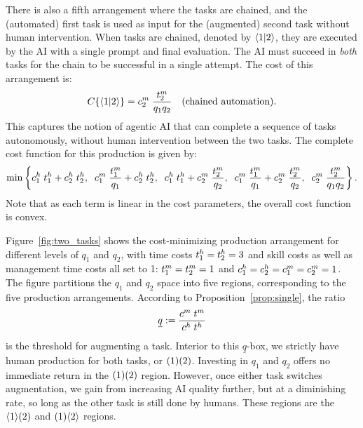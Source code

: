 \documentclass{article}
\theoremstyle{plain}
\theoremstyle{plain}
\begin{document}
There is also a fifth arrangement where the tasks are chained, and the (automated) first task is used as input for the (augmented) second task without human intervention.
When tasks are chained, denoted by $\langle 1|2 \rangle$, they are executed by the AI with a single prompt and final evaluation.
The AI must succeed in \emph{both} tasks for the chain to be successful in a single attempt.
The cost of this arrangement is:
\begin{align*}
C\{ \langle 1|2 \rangle \} &= c^{m}_{2} \; \frac{t^{m}_{2}}{q_1 q_2} & \text{(chained automation)}.
\end{align*}
This captures the notion of agentic AI that can complete a sequence of tasks autonomously, without human intervention between the two tasks.
The complete cost function for this production is given by:
\begin{align}
  \min \left\{ 
  c^{h}_{1} \; t^{h}_{1} + c^{h}_{2} \; t^{h}_{2}, \;\; 
  c^{m}_{1} \; \frac{t^{m}_{1}}{q_1} + c^{h}_{2} \; t^{h}_{2}, \;\; 
  c^{h}_{1} \; t^{h}_{1} + c^{m}_{2} \; \frac{t^{m}_{2}}{q_2}, \;\; 
  c^{m}_{1} \; \frac{t^{m}_{1}}{q_1} + c^{m}_{2} \; \frac{t^{m}_{2}}{q_2}, \;\; 
  c^{m}_{2} \; \frac{t^{m}_{2}}{q_1 q_2}
  \right\}.
\end{align}
Note that as each term is linear in the cost parameters, the overall cost function is convex.

Figure~\ref{fig:two_tasks} shows the cost-minimizing production arrangement for different levels of \(q_1\) and \(q_2\), with time costs \(t^{h}_{1} = t^{h}_{2} = 3\) and skill costs as well as management time costs all set to 1: \(t^{m}_{1} = t^{m}_{2} = 1\) and \(c^{h}_{1} = c^{h}_{2} = c^{m}_{1} = c^{m}_{2} = 1\).
The figure partitions the \(q_1\) and \(q_2\) space into five regions, corresponding to the five production arrangements.
According to Proposition~\ref{prop:single}, the ratio 
\[
\underline{q} := \frac{c^{m}_{} \; t^{m}_{}}{c^{h}_{} \; t^{h}_{}}
\]
is the threshold for augmenting a task.
Interior to this \(\underline{q}\)-box, we strictly have human production for both tasks, or \(( 1 )( 2 )\).
Investing in \(q_1\) and \(q_2\) offers no immediate return in the \(( 1 )( 2 )\) region.
However, once either task switches augmentation, we gain from increasing AI quality further, but at a diminishing rate, so long as the other task is still done by humans.
These regions are the \(\langle 1 \rangle( 2 )\) and \(( 1 )\langle 2 \rangle\) regions.
\end{document}
